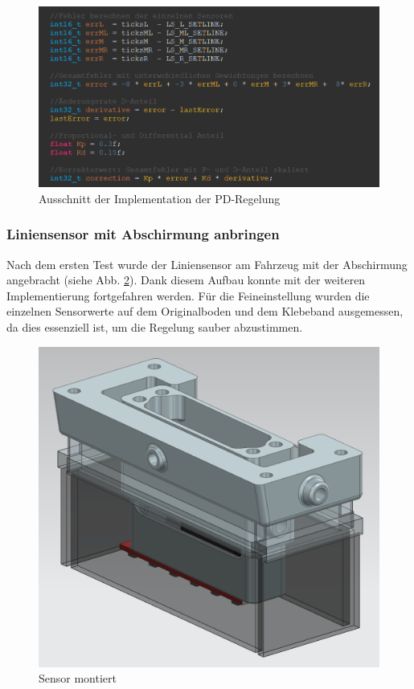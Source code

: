  \begin{figure}[H]
\centering
\includegraphics[width= \textwidth ]{assets/ET/PD-Regler/PD-Regler_Code_Pren2.png}
\caption{Ausschnitt der Implementation der PD-Regelung}
\label{fig:Ausschnitt der Implementation der PD-Regelung}
\end{figure}


\subsubsection{Liniensensor mit Abschirmung anbringen}

Nach dem ersten Test wurde der Liniensensor am Fahrzeug mit der Abschirmung angebracht (siehe Abb. \ref{fig:enter-label}). Dank diesem Aufbau konnte mit der weiteren Implementierung fortgefahren werden. Für die Feineinstellung wurden die einzelnen Sensorwerte auf dem Originalboden und dem Klebeband ausgemessen, da dies essenziell ist, um die Regelung sauber abzustimmen.


\begin{figure}[H]
    \centering
    \includegraphics[width=0.5\linewidth]{Sensor montiert.png}
    \caption{Sensor montiert}
    \label{fig:enter-label}
\end{figure}


